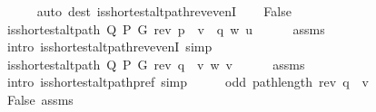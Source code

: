 \begin{isabellebody}
\ \ \ \ \isamarkupfalse%
\ {\isacharparenleft}{\kern0pt}auto\ dest{\isacharcolon}{\kern0pt}\ is{\isacharunderscore}{\kern0pt}shortest{\isacharunderscore}{\kern0pt}alt{\isacharunderscore}{\kern0pt}path{\isacharunderscore}{\kern0pt}rev{\isacharunderscore}{\kern0pt}evenI{\isacharparenright}{\kern0pt}\isanewline
{}\isamarkupfalse%
\isanewline
\ \ \isamarkupfalse%
\ False\isanewline
\ \ \isamarkupfalse%
\ {\isachardoublequoteopen}is{\isacharunderscore}{\kern0pt}shortest{\isacharunderscore}{\kern0pt}alt{\isacharunderscore}{\kern0pt}path\ Q\ P\ G\ {\isacharparenleft}{\kern0pt}rev\ {\isacharparenleft}{\kern0pt}p\ {\isacharat}{\kern0pt}\ v\ {\isacharhash}{\kern0pt}\ q{\isacharparenright}{\kern0pt}{\isacharparenright}{\kern0pt}\ w\ u{\isachardoublequoteclose}\isanewline
\ \ \ \ \isamarkupfalse%
\ assms{\isacharparenleft}{\kern0pt}{}{\isacharcomma}{\kern0pt}\ {}{\isacharparenright}{\kern0pt}\isanewline
\ \ \ \ \isamarkupfalse%
\ {\isacharparenleft}{\kern0pt}intro\ is{\isacharunderscore}{\kern0pt}shortest{\isacharunderscore}{\kern0pt}alt{\isacharunderscore}{\kern0pt}path{\isacharunderscore}{\kern0pt}rev{\isacharunderscore}{\kern0pt}evenI{\isacharparenright}{\kern0pt}\ simp{\isacharplus}{\kern0pt}\isanewline
\ \ \isamarkupfalse%
\ {\isachardoublequoteopen}is{\isacharunderscore}{\kern0pt}shortest{\isacharunderscore}{\kern0pt}alt{\isacharunderscore}{\kern0pt}path\ Q\ P\ G\ {\isacharparenleft}{\kern0pt}rev\ q\ {\isacharat}{\kern0pt}\ {\isacharbrackleft}{\kern0pt}v{\isacharbrackright}{\kern0pt}{\isacharparenright}{\kern0pt}\ w\ v{\isachardoublequoteclose}\isanewline
\ \ \ \ \isamarkupfalse%
\ assms{\isacharparenleft}{\kern0pt}{}{\isacharparenright}{\kern0pt}\isanewline
\ \ \ \ \isamarkupfalse%
\ {\isacharparenleft}{\kern0pt}intro\ is{\isacharunderscore}{\kern0pt}shortest{\isacharunderscore}{\kern0pt}alt{\isacharunderscore}{\kern0pt}path{\isacharunderscore}{\kern0pt}pref{\isacharparenright}{\kern0pt}\ simp\isanewline
\ \ \isamarkupfalse%
\ \isamarkupfalse%
\ {\isachardoublequoteopen}odd\ {\isacharparenleft}{\kern0pt}path{\isacharunderscore}{\kern0pt}length\ {\isacharparenleft}{\kern0pt}rev\ q\ {\isacharat}{\kern0pt}\ {\isacharbrackleft}{\kern0pt}v{\isacharbrackright}{\kern0pt}{\isacharparenright}{\kern0pt}{\isacharparenright}{\kern0pt}{\isachardoublequoteclose}\isanewline
\ \ \ \ \isamarkupfalse%
\ False\ assms{\isacharparenleft}{\kern0pt}{}{\isacharparenright}{\kern0pt}\isanewline

\end{isabellebody}
